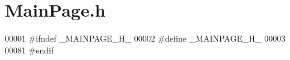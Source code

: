 \section{Main\-Page.\-h}
\label{_main_page_8h}

\begin{DoxyCode}
00001 \textcolor{preprocessor}{#ifndef \_MAINPAGE\_H\_}
00002 \textcolor{preprocessor}{}\textcolor{preprocessor}{#define \_MAINPAGE\_H\_}
00003 \textcolor{preprocessor}{}
00081 \textcolor{preprocessor}{#endif}
\end{DoxyCode}
